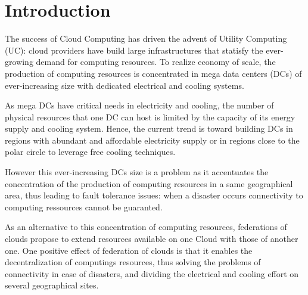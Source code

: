 \section{Introduction}
\label{sec:intro} 


The success of Cloud Computing has driven the advent of Utility Computing (UC): 
cloud providers have build large infrastructures that statisfy the ever-growing 
demand for computing resources. To realize economy of scale, the production
of computing resources is concentrated in mega data centers (DCs) of 
ever-increasing size with dedicated electrical and cooling systems.

As mega DCs have critical needs in electricity and cooling, the number of 
physical resources that one DC can host is limited by the capacity of its energy
supply and cooling system. Hence, the current trend is toward building DCs in 
regions with abundant and affordable electricity supply or in regions close to
the polar circle to leverage free cooling techniques. 

However this ever-increasing DCs size is a problem as it accentuates the 
concentration of the production of computing resources in a same geographical
area, thus leading to fault tolerance issues: when a disaster occurs 
connectivity to computing ressources cannot be guaranted.

As an alternative to this concentration of computing resources, federations of
clouds propose to extend resources available on one Cloud with those of another
one. One positive effect of federation of clouds is that it enables the 
decentralization of computings resources, thus solving the problems of 
connectivity in case of disasters, and dividing the electrical and cooling 
effort on several geographical sites.

